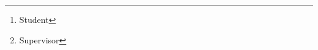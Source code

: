 \documentclass{article}
\title{\mytitle}
\date{2021}
\author{Diego Bellani\thanks{Student}\and Enrico Tronci\thanks{Supervisor}}
\begin{document}
\begin{titlepage}
	\maketitle

	\begin{abstract}
	(Max one page, da scrivere alla fine)
	\end{abstract}

	\tableofcontents

\end{titlepage}


\end{document}
